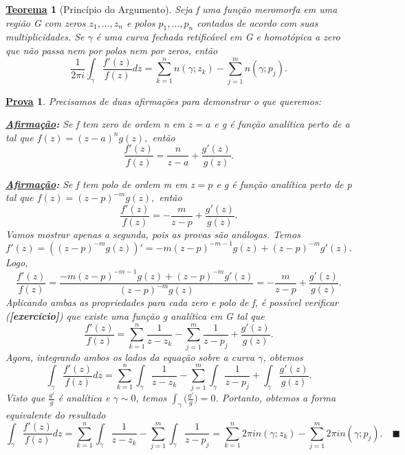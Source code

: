 \documentclass{article}
\newtheorem*{theorem*}{\underline{Teorema}}
\newtheorem*{proof*}{\underline{Prova}}
\renewcommand\qedsymbol{$\blacksquare$}
\begin{document}
  \hypertarget{argument-principle}{\begin{theorem*}[Princípio do Argumento]
      Seja f uma função meromorfa em uma região G com zeros \(z_{1},\dotsc ,z_{n}\) e polos \(p_{1},\dotsc , p_{n} \) contados
      de acordo com suas multiplicidades. Se \(\gamma \) é uma curva fechada retificável em G e homotópica a zero que não passa nem por polos
      nem por zeros, então 
      \[
        \frac{1}{2\pi i}\int_{\gamma }^{}\frac{f'(z)}{f(z)}dz = \sum\limits_{k=1}^{n}n(\gamma ; z_{k}) - \sum\limits_{j=1}^{m}n(\gamma ; p_{j}).
      \]
  \end{theorem*}}
  \begin{proof*}
    Precisamos de duas afirmações para demonstrar o que queremos:

    \textbf{\underline{Afirmação}:} Se f tem zero de ordem n em \(z=a\) e g é função analítica perto de a tal que \(f(z) = (z-a)^{n}g(z),\) então 
    \[
      \frac{f'(z)}{f(z)} = \frac{n}{z-a} + \frac{g'(z)}{g(z)}.
    \]

    \textbf{\underline{Afirmação}:} Se f tem polo de ordem m em \(z=p\) e g é função analítica perto de p tal que \(f(z) = (z-p)^{-m}g(z),\) então 
    \[
      \frac{f'(z)}{f(z)} = -\frac{m}{z-p} + \frac{g'(z)}{g(z)}.
    \]
    Vamos mostrar apenas a segunda, pois as provas são análogas. Temos 
    \[
      f'(z) = ((z-p)^{-m}g(z))' = -m(z-p)^{-m-1}g(z) + (z-p)^{-m}g'(z).
    \]
    Logo,
    \[
      \frac{f'(z)}{f(z)} = \frac{-m(z-p)^{-m-1}g(z) + (z-p)^{-m}g'(z)}{(z-p)^{-m}g(z)} = -\frac{m}{z-p} + \frac{g'(z)}{g(z)}.
    \]
    Aplicando ambas as propriedades para cada zero e polo de f, é possível verificar (\textbf{[exercício]}) que existe uma função g analítica em G tal que 
    \[
      \frac{f'(z)}{f(z)} = \sum\limits_{k=1}^{n}\frac{1}{z-z_{k}} - \sum\limits_{j=1}^{m}\frac{1}{z-p_{j}} + \frac{g'(z)}{g(z)}.
    \]
    Agora, integrando ambos os lados da equação sobre a curva \(\gamma \), obtemos 
    \[
      \int_{\gamma }^{}\frac{f'(z)}{f(z)}dz = \sum\limits_{k=1}^{n}\int_{\gamma }^{}\frac{1}{z-z_{k}} - \sum\limits_{j=1}^{m}\int_{\gamma }^{}\frac{1}{z-p_{j}} + \int_{\gamma }^{}\frac{g'(z)}{g(z)}.
    \]
    Visto que \(\frac{g'}{g}\) é analítica e \(\gamma \sim 0\), temos \(\int_{\gamma }^{}\biggl(\frac{g'}{g}\biggr) = 0\). Portanto, obtemos a forma equivalente do resultado
    \[
      \int_{\gamma }^{}\frac{f'(z)}{f(z)}dz = \sum\limits_{k=1}^{n}\int_{\gamma }^{}\frac{1}{z-z_{k}} - \sum\limits_{j=1}^{m}\int_{\gamma }^{}\frac{1}{z-p_{j}} = \sum\limits_{k=1}^{n}2\pi i n(\gamma ; z_{k}) - \sum\limits_{j=1}^{m}2\pi i n(\gamma ; p_{j}).\quad \text{\qedsymbol}
    \]
  \end{proof*}
\end{document}
